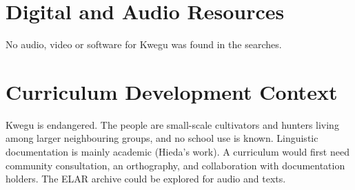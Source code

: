 \documentclass[12pt]{article}
\begin{document}
\section{Digital and Audio Resources}
No audio, video or software for Kwegu was found in the searches.

\section{Curriculum Development Context}
Kwegu is endangered. The people are small-scale cultivators and hunters living among larger neighbouring groups, and no school use is known. Linguistic documentation is mainly academic (Hieda's work). A curriculum would first need community consultation, an orthography, and collaboration with documentation holders. The ELAR archive could be explored for audio and texts.
\end{document}

